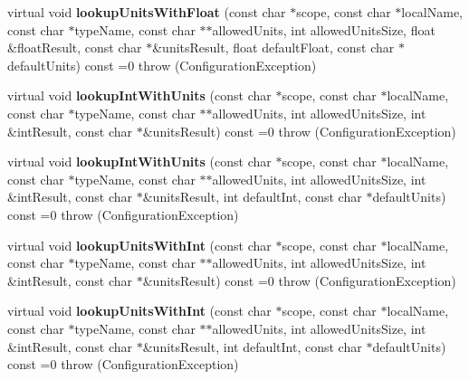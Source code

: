 \begin{DoxyCompactItemize}
\item 
\hypertarget{classCONFIG4CPP__NAMESPACE_1_1Configuration_a9a30a5b4f012a9b8b2e19361a272b049}{virtual void {\bfseries lookup\-Units\-With\-Float} (const char $\ast$scope, const char $\ast$local\-Name, const char $\ast$type\-Name, const char $\ast$$\ast$allowed\-Units, int allowed\-Units\-Size, float \&float\-Result, const char $\ast$\&units\-Result, float default\-Float, const char $\ast$default\-Units) const =0  throw (\-Configuration\-Exception)}\label{classCONFIG4CPP__NAMESPACE_1_1Configuration_a9a30a5b4f012a9b8b2e19361a272b049}

\item 
\hypertarget{classCONFIG4CPP__NAMESPACE_1_1Configuration_a7182f206efac4765215534807d1c2485}{virtual void {\bfseries lookup\-Int\-With\-Units} (const char $\ast$scope, const char $\ast$local\-Name, const char $\ast$type\-Name, const char $\ast$$\ast$allowed\-Units, int allowed\-Units\-Size, int \&int\-Result, const char $\ast$\&units\-Result) const =0  throw (\-Configuration\-Exception)}\label{classCONFIG4CPP__NAMESPACE_1_1Configuration_a7182f206efac4765215534807d1c2485}

\item 
\hypertarget{classCONFIG4CPP__NAMESPACE_1_1Configuration_a34ecd7e12e787054b7cc49de6570d7f4}{virtual void {\bfseries lookup\-Int\-With\-Units} (const char $\ast$scope, const char $\ast$local\-Name, const char $\ast$type\-Name, const char $\ast$$\ast$allowed\-Units, int allowed\-Units\-Size, int \&int\-Result, const char $\ast$\&units\-Result, int default\-Int, const char $\ast$default\-Units) const =0  throw (\-Configuration\-Exception)}\label{classCONFIG4CPP__NAMESPACE_1_1Configuration_a34ecd7e12e787054b7cc49de6570d7f4}

\item 
\hypertarget{classCONFIG4CPP__NAMESPACE_1_1Configuration_aeef6917fd510cce95021efe7146f5f2d}{virtual void {\bfseries lookup\-Units\-With\-Int} (const char $\ast$scope, const char $\ast$local\-Name, const char $\ast$type\-Name, const char $\ast$$\ast$allowed\-Units, int allowed\-Units\-Size, int \&int\-Result, const char $\ast$\&units\-Result) const =0  throw (\-Configuration\-Exception)}\label{classCONFIG4CPP__NAMESPACE_1_1Configuration_aeef6917fd510cce95021efe7146f5f2d}

\item 
\hypertarget{classCONFIG4CPP__NAMESPACE_1_1Configuration_aaf749dca18f5dd7d82b49f1bc0ae5815}{virtual void {\bfseries lookup\-Units\-With\-Int} (const char $\ast$scope, const char $\ast$local\-Name, const char $\ast$type\-Name, const char $\ast$$\ast$allowed\-Units, int allowed\-Units\-Size, int \&int\-Result, const char $\ast$\&units\-Result, int default\-Int, const char $\ast$default\-Units) const =0  throw (\-Configuration\-Exception)}\label{classCONFIG4CPP__NAMESPACE_1_1Configuration_aaf749dca18f5dd7d82b49f1bc0ae5815}


\end{DoxyCompactItemize}
